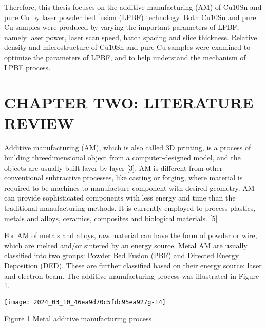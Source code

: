 \documentclass[10pt]{article}
\begin{document}
Therefore, this thesis focuses on the additive manufacturing (AM) of Cu10Sn and pure Cu by laser powder bed fusion (LPBF) technology. Both Cu10Sn and pure Cu samples were produced by varying the important parameters of LPBF, namely laser power, laser scan speed, hatch spacing and slice thickness. Relative density and microstructure of Cu10Sn and pure Cu samples were examined to optimize the parameters of LPBF, and to help understand the mechanism of LPBF process.

\section*{CHAPTER TWO: LITERATURE REVIEW }
Additive manufacturing (AM), which is also called 3D printing, is a process of building threedimensional object from a computer-designed model, and the objects are usually built layer by layer [3]. AM is different from other conventional subtractive processes, like casting or forging, where material is required to be machines to manufacture component with desired geometry. AM can provide sophisticated components with less energy and time than the traditional manufacturing methods. It is currently employed to process plastics, metals and alloys, ceramics, composites and biological materials. [5]

For AM of metals and alloys, raw material can have the form of powder or wire, which are melted and/or sintered by an energy source. Metal AM are usually classified into two groups: Powder Bed Fusion (PBF) and Directed Energy Deposition (DED). These are further classified based on their energy source: laser and electron beam. The additive manufacturing process was illustrated in Figure 1.

\begin{center}
\texttt{[image: 2024\_03\_10\_46ea9d70c5fdc95ea927g-14]}
\end{center}

Figure 1 Metal additive manufacturing process
\end{document}
